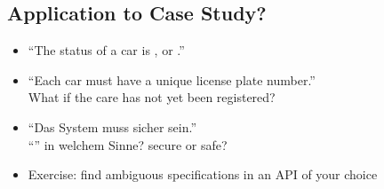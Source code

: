 \subsection*{Application to Case Study?}
\begin{defBox}[title=What is meant with ...?] 
	\begin{itemize}
		\item \enquote{The status of a car is ,  or .}
		\item \enquote{Each car must have a unique license plate number.}\\
		What if the care has not yet been registered?
		\item \enquote{Das System muss sicher sein.}\\
		\enquote{} in welchem Sinne? secure or safe?
		\item Exercise: find ambiguous specifications in an API of your choice
	\end{itemize}
\end{defBox}

